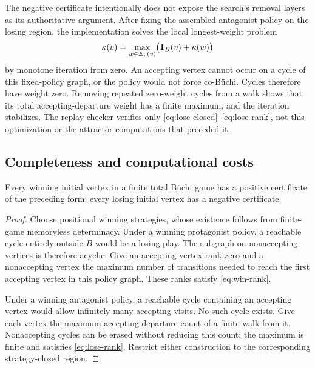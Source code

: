 The negative certificate intentionally does not expose the search's removal
layers as its authoritative argument. After fixing the assembled antagonist
policy on the losing region, the implementation solves the local longest-weight
problem
\begin{equation}
 \kappa(v)=\max_{w\in E_\tau(v)}
                  \bigl(\mathbf{1}_B(v)+\kappa(w)\bigr)
 \label{eq:counter-longest}
\end{equation}
by monotone iteration from zero. An accepting vertex cannot occur on a cycle
of this fixed-policy graph, or the policy would not force co-B\"uchi. Cycles
therefore have weight zero. Removing repeated zero-weight cycles from a walk
shows that its total accepting-departure weight has a finite maximum, and the
iteration stabilizes. The replay checker verifies only
\eqref{eq:lose-closed}--\eqref{eq:lose-rank}, not this optimization or the
attractor computations that preceded it.

\subsection{Completeness and computational costs}
\begin{proposition}
Every winning initial vertex in a finite total B\"uchi game has a positive
certificate of the preceding form; every losing initial vertex has a negative
certificate.
\end{proposition}
\begin{proof}
Choose positional winning strategies, whose existence follows from finite-game
memoryless determinacy. Under a winning protagonist policy, a reachable cycle
entirely outside $B$ would be a losing play. The subgraph on nonaccepting
vertices is therefore acyclic. Give an accepting vertex rank zero and a
nonaccepting vertex the maximum number of transitions needed to reach the
first accepting vertex in this policy graph. These ranks satisfy
\eqref{eq:win-rank}.

Under a winning antagonist policy, a reachable cycle containing an accepting
vertex would allow infinitely many accepting visits. No such cycle exists.
Give each vertex the maximum accepting-departure count of a finite walk from
it. Nonaccepting cycles can be erased without reducing this count; the maximum
is finite and satisfies \eqref{eq:lose-rank}. Restrict either construction to
the corresponding strategy-closed region.
\end{proof}

